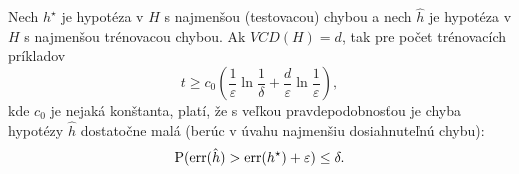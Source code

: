 \begin{theorem}
  Nech $h^\star$ je hypotéza v $H$ s najmenšou (testovacou) chybou a
  nech $\hat{h}$ je hypotéza v $H$ s najmenšou trénovacou chybou. Ak
  $VCD(H) = d$, tak pre počet trénovacích príkladov
  $$ t \geq c_0 \left( \frac{1}{\varepsilon} \ln{\frac{1}{\delta}} + \frac{d}{\varepsilon} \ln{\frac{1}{\varepsilon}} \right), $$
  kde $c_0$ je nejaká konštanta, platí, že s veľkou pravdepodobnosťou
  je chyba hypotézy $\hat{h}$ dostatočne malá (berúc v úvahu najmenšiu
  dosiahnuteľnú chybu):
  $$ \operatorname*{\mathrm{P}}( \mathrm{err}(\hat{h}) > \mathrm{err}(h^\star) + \varepsilon ) \leq \delta. $$
\end{theorem}

